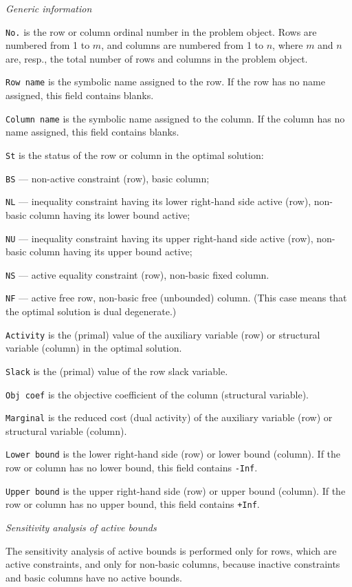\newpage

\noindent
{\it Generic information}

{\tt No.} is the row or column ordinal number in the problem object.
Rows are numbered from 1 to $m$, and columns are numbered from 1 to $n$,
where $m$ and $n$ are, resp., the total number of rows and columns in
the problem object.

{\tt Row name} is the symbolic name assigned to the row. If the row has
no name assigned, this field contains blanks.

{\tt Column name} is the symbolic name assigned to the column. If the
column has no name assigned, this field contains blanks.

{\tt St} is the status of the row or column in the optimal solution:

{\tt BS} --- non-active constraint (row), basic column;

{\tt NL} --- inequality constraint having its lower right-hand side
active (row), non-basic column having its lower bound active;

{\tt NU} --- inequality constraint having its upper right-hand side
active (row), non-basic column having its upper bound active;

{\tt NS} --- active equality constraint (row), non-basic fixed column.

{\tt NF} --- active free row, non-basic free (unbounded) column. (This
case means that the optimal solution is dual degenerate.)

{\tt Activity} is the (primal) value of the auxiliary variable (row) or
structural variable (column) in the optimal solution.

{\tt Slack} is the (primal) value of the row slack variable.

{\tt Obj coef} is the objective coefficient of the column (structural
variable).

{\tt Marginal} is the reduced cost (dual activity) of the auxiliary
variable (row) or structural variable (column).

{\tt Lower bound} is the lower right-hand side (row) or lower bound
(column). If the row or column has no lower bound, this field contains
{\tt -Inf}.

{\tt Upper bound} is the upper right-hand side (row) or upper bound
(column). If the row or column has no upper bound, this field contains
{\tt +Inf}.

\noindent
{\it Sensitivity analysis of active bounds}

The sensitivity analysis of active bounds is performed only for rows,
which are active constraints, and only for non-basic columns, because
inactive constraints and basic columns have no active bounds.

